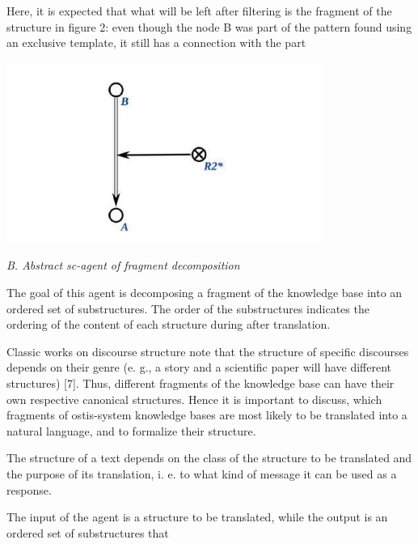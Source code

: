 \documentclass{scndocument}
\begin{document}
\begin{SCn}
\begin{multicols}{2}
\caption{\small Figure 1. An example of a structure prior to filtering.}
\begin{justify} 
Here, it is expected that what will be left after filtering
is the fragment of the structure in figure 2: even though
the node B was part of the pattern found using an
exclusive template, it still has a connection with the part
\end{justify}
\centering
\includegraphics[width=\linewidth]{Снимок экрана 2024-09-16 091549.jpg}
\caption {\small Figure 2. An example of the result of filtering.}
\begin{flushleft}
\textit{B. Abstract sc-agent of fragment decomposition}
\end{flushleft}
\begin{justify}
The goal of this agent is decomposing a fragment of
the knowledge base into an ordered set of substructures.
The order of the substructures indicates the ordering of
the content of each structure during after translation.\par
Classic works on discourse structure note that the
structure of specific discourses depends on their genre
(e. g., a story and a scientific paper will have different
structures) [7]. Thus, different fragments of the knowledge base can have their own respective canonical structures. Hence it is important to discuss, which fragments
of ostis-system knowledge bases are most likely to be
translated into a natural language, and to formalize their
structure.\par
The structure of a text depends on the class of the
structure to be translated and the purpose of its translation, i. e. to what kind of message it can be used as a
response.\par
The input of the agent is a structure to be translated,
while the output is an ordered set of substructures that

\end{justify}
\end{multicols}
\end{SCn}
\end{document}
